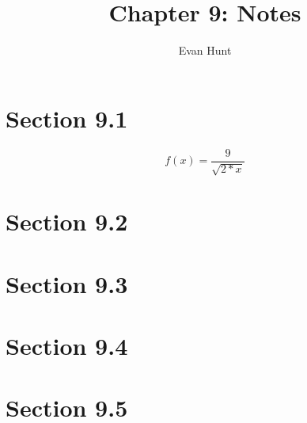 \documentclass[12pt]{article}
\title{Chapter 9: Notes}
\author{Evan Hunt}
\begin{document}
    \maketitle

    \section[]{Section 9.1}
        \begin{equation}
            f(x) = \frac{9}{\sqrt{2*x}}
        \end{equation}
    \section[]{Section 9.2}
    \section[]{Section 9.3}
    \section[]{Section 9.4}
    \section[]{Section 9.5}
\end{document}
